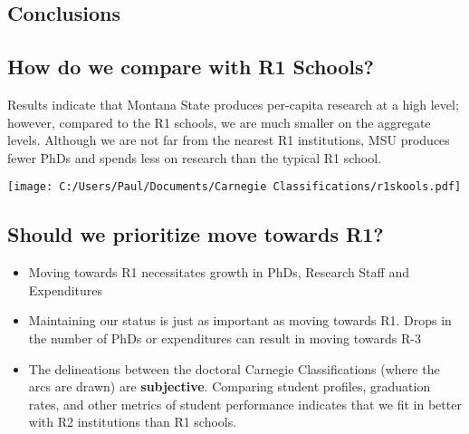 \documentclass[a0,portrait]{a0poster}
\begin{document}
\begin{multicols}{2}

\color{SaddleBrown} %

\section*{Conclusions}

\subsection*{How do we compare with R1 Schools?}
Results indicate that Montana State produces per-capita research at a high level; however, compared to the R1 schools, we are much smaller on the aggregate levels. Although we are not far from the nearest R1 institutions, MSU produces fewer PhDs and spends less on research than the typical R1 school. 

\begin{center}
	\texttt{[image: C:/Users/Paul/Documents/Carnegie Classifications/r1skools.pdf]}\\
\end{center}


\color{SaddleBrown}
\subsection*{Should we prioritize move towards R1?}
\begin{itemize}
	\item Moving towards R1 necessitates growth in PhDs, Research Staff and Expenditures
	\item Maintaining our status is just as important as moving towards R1. Drops in the number of  PhDs or expenditures can result in moving towards R-3 
	\item The delineations between the doctoral Carnegie Classifications (where the arcs are drawn) are \textbf{subjective}. Comparing student profiles, graduation rates, and other metrics of student performance indicates that we fit in better with R2 institutions than R1 schools. 
\end{itemize}


\end{multicols}
\end{document}
